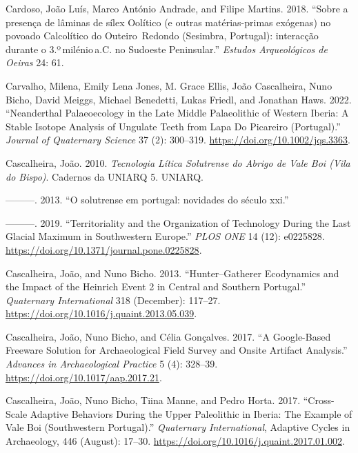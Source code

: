 \documentclass[
  a4paper,
  DIV=11,
  numbers=noendperiod]{scrreprt}
\newlength{\cslhangindent}
\newenvironment{CSLReferences}[2] %
 {\begin{list}{}{%
  \setlength{\itemindent}{0pt}
  \setlength{\leftmargin}{0pt}
  \setlength{\parsep}{0pt}
  \ifodd #1
   \setlength{\leftmargin}{\cslhangindent}
   \setlength{\itemindent}{-1\cslhangindent}
  \fi
  \setlength{\itemsep}{#2\baselineskip}}}
 {\end{list}}
\begin{document}
\begin{CSLReferences}{1}{0}
Cardoso, João Luís, Marco António Andrade, and Filipe Martins. 2018.
{``{Sobre a presen{ç}a de l{â}minas de s{í}lex Ool{í}tico (e outras
mat{é}rias-primas ex{ó}genas) no povoado Calcol{í}tico do
Outeiro~Redondo (Sesimbra, Portugal): interac{ç}{ã}o durante o
3.º mil{é}nio a.C. no Sudoeste Peninsular}.''} \emph{Estudos
Arqueol{ó}gicos de Oeiras} 24: 61.

Carvalho, Milena, Emily Lena Jones, M. Grace Ellis, João Cascalheira,
Nuno Bicho, David Meiggs, Michael Benedetti, Lukas Friedl, and Jonathan
Haws. 2022. {``Neanderthal Palaeoecology in the Late {Middle
Palaeolithic} of Western {Iberia}: A Stable Isotope Analysis of Ungulate
Teeth from {Lapa} Do {Picareiro} ({Portugal}).''} \emph{Journal of
Quaternary Science} 37 (2): 300--319.
\url{https://doi.org/10.1002/jqs.3363}.

Cascalheira, João. 2010. \emph{{Tecnologia L{í}tica Solutrense do Abrigo
de Vale Boi (Vila do Bispo)}}. {Cadernos da UNIARQ} 5. UNIARQ.

---------. 2013. {``{O solutrense em portugal: novidades do s{é}culo
xxi}.''}

---------. 2019. {``Territoriality and the Organization of Technology
During the {Last Glacial Maximum} in Southwestern {Europe}.''}
\emph{PLOS ONE} 14 (12): e0225828.
\url{https://doi.org/10.1371/journal.pone.0225828}.

Cascalheira, João, and Nuno Bicho. 2013. {``Hunter--Gatherer Ecodynamics
and the Impact of the {Heinrich} Event 2 in {Central} and {Southern
Portugal}.''} \emph{Quaternary International} 318 (December): 117--27.
\url{https://doi.org/10.1016/j.quaint.2013.05.039}.

Cascalheira, João, Nuno Bicho, and Célia Gonçalves. 2017. {``A
{Google-Based Freeware Solution} for {Archaeological Field Survey} and
{Onsite Artifact Analysis}.''} \emph{Advances in Archaeological
Practice} 5 (4): 328--39. \url{https://doi.org/10.1017/aap.2017.21}.

Cascalheira, João, Nuno Bicho, Tiina Manne, and Pedro Horta. 2017.
{``Cross-Scale Adaptive Behaviors During the {Upper Paleolithic} in
{Iberia}: {The} Example of {Vale Boi} ({Southwestern Portugal}).''}
\emph{Quaternary International}, Adaptive {Cycles} in {Archaeology}, 446
(August): 17--30. \url{https://doi.org/10.1016/j.quaint.2017.01.002}.


\end{CSLReferences}
\end{document}
